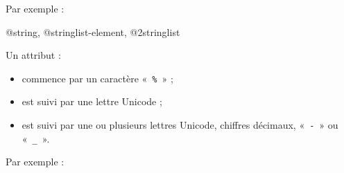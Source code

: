 Par exemple :
\begin{galgas}
 @string, @stringlist-element, @2stringlist
\end{galgas}





Un attribut :
\begin{itemize}
  \item commence par un caractère «~\texttt{\%}~» ;
  \item est suivi par une lettre Unicode ;
  \item est suivi par une ou plusieurs lettres Unicode, chiffres décimaux, «~\texttt{-}~» ou «~\texttt{\_}~».
\end{itemize}

Par exemple :
\begin{galgas}
\end{galgas}


